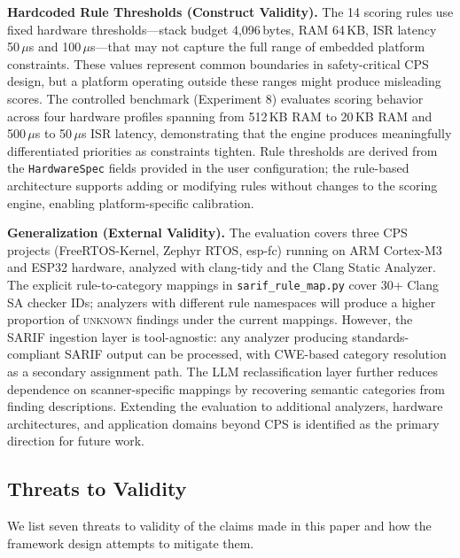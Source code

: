 \textbf{Hardcoded Rule Thresholds (Construct Validity).}
The 14 scoring rules use fixed hardware thresholds---stack budget 4{,}096\,bytes, RAM 64\,KB, ISR latency 50\,$\mu$s and 100\,$\mu$s---that may not capture the full range of embedded platform constraints. These values represent common boundaries in safety-critical CPS design, but a platform operating outside these ranges might produce misleading scores. The controlled benchmark (Experiment 8) evaluates scoring behavior across four hardware profiles spanning from 512\,KB RAM to 20\,KB RAM and 500\,$\mu$s to 50\,$\mu$s ISR latency, demonstrating that the engine produces meaningfully differentiated priorities as constraints tighten. Rule thresholds are derived from the \texttt{HardwareSpec} fields provided in the user configuration; the rule-based architecture supports adding or modifying rules without changes to the scoring engine, enabling platform-specific calibration.

\textbf{Generalization (External Validity).}
The evaluation covers three CPS projects (FreeRTOS-Kernel, Zephyr RTOS, esp-fc) running on ARM Cortex-M3 and ESP32 hardware, analyzed with clang-tidy and the Clang Static Analyzer. The explicit rule-to-category mappings in \texttt{sarif\_rule\_map.py} cover 30+ Clang SA checker IDs; analyzers with different rule namespaces will produce a higher proportion of \textsc{unknown} findings under the current mappings. However, the SARIF ingestion layer is tool-agnostic: any analyzer producing standards-compliant SARIF output can be processed, with CWE-based category resolution as a secondary assignment path. The LLM reclassification layer further reduces dependence on scanner-specific mappings by recovering semantic categories from finding descriptions. Extending the evaluation to additional analyzers, hardware architectures, and application domains beyond CPS is identified as the primary direction for future work.


\subsection{Threats to Validity}

We list seven threats to validity of the claims made in this paper and how the framework design attempts to mitigate them.

